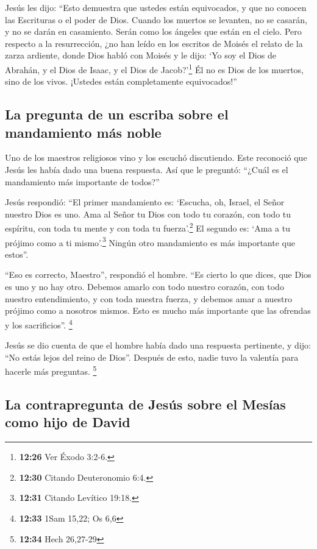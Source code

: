 Jesús les dijo: ``Esto demuestra que ustedes están
equivocados, y que no conocen las Escrituras o el poder de Dios.
 Cuando los muertos se levanten, no se casarán, y no se
darán en casamiento. Serán como los ángeles que están en el cielo.
 Pero respecto a la resurrección, ¿no han leído en los
escritos de Moisés el relato de la zarza ardiente, donde Dios habló con
Moisés y le dijo: `Yo soy el Dios de Abrahán, y el Dios de Isaac, y el
Dios de Jacob?'\footnote{\textbf{12:26} Ver Éxodo 3:2-6.}
 Él no es Dios de los muertos, sino de los vivos.
¡Ustedes están completamente equivocados!''

\hypertarget{la-pregunta-de-un-escriba-sobre-el-mandamiento-muxe1s-noble}{%
\subsection{La pregunta de un escriba sobre el mandamiento más
noble}\label{la-pregunta-de-un-escriba-sobre-el-mandamiento-muxe1s-noble}}

 Uno de los maestros religiosos vino y los escuchó
discutiendo. Este reconoció que Jesús les había dado una buena
respuesta. Así que le preguntó: ``¿Cuál es el mandamiento más importante
de todos?''

 Jesús respondió: ``El primer mandamiento es: `Escucha,
oh, Israel, el Señor nuestro Dios es uno.  Ama al Señor
tu Dios con todo tu corazón, con todo tu espíritu, con toda tu mente y
con toda tu fuerza'.\footnote{\textbf{12:30} Citando Deuteronomio 6:4.}
 El segundo es: `Ama a tu prójimo como a ti
mismo'.\footnote{\textbf{12:31} Citando Levítico 19:18.} Ningún otro
mandamiento es más importante que estos''.

 ``Eso es correcto, Maestro'', respondió el hombre. ``Es
cierto lo que dices, que Dios es uno y no hay otro. 
Debemos amarlo con todo nuestro corazón, con todo nuestro entendimiento,
y con toda nuestra fuerza, y debemos amar a nuestro prójimo como a
nosotros mismos. Esto es mucho más importante que las ofrendas y los
sacrificios''. \footnote{\textbf{12:33} 1Sam 15,22; Os 6,6}

 Jesús se dio cuenta de que el hombre había dado una
respuesta pertinente, y dijo: ``No estás lejos del reino de Dios''.
Después de esto, nadie tuvo la valentía para hacerle más preguntas.
\footnote{\textbf{12:34} Hech 26,27-29}

\hypertarget{la-contrapregunta-de-jesuxfas-sobre-el-mesuxedas-como-hijo-de-david}{%
\subsection{La contrapregunta de Jesús sobre el Mesías como hijo de
David}\label{la-contrapregunta-de-jesuxfas-sobre-el-mesuxedas-como-hijo-de-david}}

